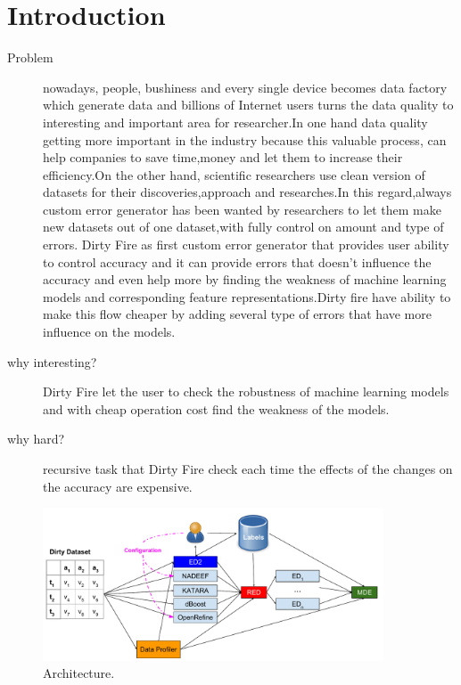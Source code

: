 \section{Introduction}

\begin{description}
\item[Problem]

nowadays, people, bushiness and every single device becomes data factory which generate data and billions of Internet users turns the data quality to interesting and important area for researcher.In one hand data quality getting more important in the industry because this valuable process, can help companies to save time,money and let them to increase their efficiency.On the other hand, scientific researchers use clean version of datasets for their discoveries,approach and researches.In this regard,always custom error generator has been wanted by researchers to let them make new datasets out of one dataset,with fully control on amount and type of errors.
Dirty Fire as first custom error generator that provides user ability to control accuracy and it can provide errors that doesn't influence the accuracy and even help more by finding the weakness of machine learning models and corresponding feature representations.Dirty fire have ability to make this flow cheaper by adding several type of errors that have more influence on the models.

\item[why interesting?] 
Dirty Fire let the user to check the robustness of machine learning models and with cheap operation cost find the weakness of the models.
\item[why hard?]
recursive task that Dirty Fire check each time the effects of the changes on the accuracy are expensive.


\end{description}

\begin{figure}[ht!]
	\centering
	\includegraphics[width=0.9\textwidth]{img/demo.pdf}
	\caption{Architecture.}
	\label{figure:architecture}
\end{figure}

